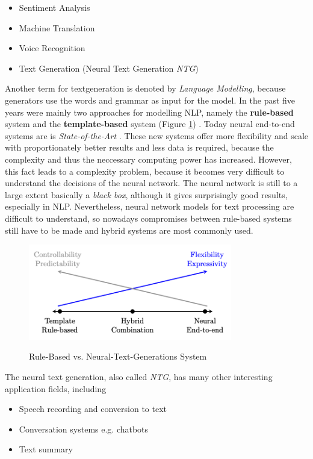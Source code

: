\begin{itemize}
\item Sentiment Analysis
\item Machine Translation
\item Voice Recognition
\item Text Generation (Neural Text Generation \textit{NTG})
\end{itemize}

Another term for textgeneration is denoted by \textit{Language Modelling}, because generators use the words and grammar as input for the model. In the past five years were mainly two approaches for modelling NLP, namely the \textbf{rule-based} system and the \textbf{template-based} system (Figure \ref{rules_based}) \cite{NTG2}. Today neural end-to-end systems are is \textit{State-of-the-Art} \cite{End_to_End}. These new systems offer more flexibility and scale with proportionately better results and less data is required, because the complexity and thus the neccessary computing power has increased. However, this fact leads to a complexity problem, because it becomes very difficult to understand the decisions of the neural network. The neural network is still to a large extent basically a \textit{black box}, although it gives surprisingly good results, especially in NLP. Nevertheless, neural network models for text processing are difficult to understand, so nowadays compromises between rule-based systems still have to be made and hybrid systems are most commonly used. 

\begin{figure}
  \begin{center}
  \includegraphics[width=3.5in]{photos/rule_based}\\
  \caption{Rule-Based vs. Neural-Text-Generations System \cite{NTG2}}\label{rules_based}
  \end{center}
\end{figure}

The neural text generation, also called \textit{NTG}, has many other interesting application fields, including
\begin{itemize}
\item Speech recording and conversion to text
\item Conversation systems e.g. chatbots
\item Text summary
\end{itemize} 

